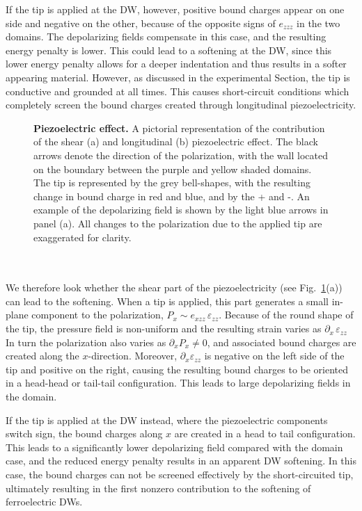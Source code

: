 If the tip is applied at the DW, however, positive bound charges appear on one side and negative on the other, because of the opposite signs of $e_{zzz}$ in the two domains.
The depolarizing fields compensate in this case, and the resulting energy penalty is lower.
This could lead to a softening at the DW, since this lower energy penalty allows for a deeper indentation and thus results in a softer appearing material.
However, as discussed in the experimental Section, the tip is conductive and grounded at all times.
This causes short-circuit conditions which completely screen the bound charges created through longitudinal piezoelectricity.
\begin{figure}[h]
	\caption{\label{fig:BTO_depolarizing}{\bf Piezoelectric effect.} A pictorial representation of the contribution of the shear (a) and longitudinal (b) piezoelectric effect. The black arrows denote the direction of the polarization, with the wall located on the boundary between the purple and yellow shaded domains. The tip is represented by the grey bell-shapes, with the resulting change in bound charge in red and blue, and by the + and -. An example of the depolarizing field is shown by the light blue arrows in panel (a). All changes to the polarization due to the applied tip are exaggerated for clarity.}
\end{figure}
\\\\
We therefore look whether the shear part of the piezoelectricity (see Fig.~\ref{fig:BTO_depolarizing}(a)) can lead to the softening.
When a tip is applied, this part generates a small in-plane component to the polarization, $P_x \sim e_{xzz}\,\varepsilon_{zz}$.
Because of the round shape of the tip, the pressure field is non-uniform and the resulting strain varies as $\partial_x\,\varepsilon_{zz}$
In turn the polarization also varies as $\partial_x P_x\neq 0$, and associated bound charges are created along the $x$-direction.
Moreover, $\partial_x \varepsilon_{zz}$ is negative on the left side of the tip and positive on the right, causing the resulting bound charges to be oriented in a head-head or tail-tail configuration.
This leads to large depolarizing fields in the domain.

If the tip is applied at the DW instead, where the piezoelectric components switch sign, the bound charges along $x$ are created in a head to tail configuration.
This leads to a significantly lower depolarizing field compared with the domain case, and the reduced energy penalty results in an apparent DW softening.
In this case, the bound charges can not be screened effectively by the short-circuited tip, ultimately resulting in the first nonzero contribution to the softening of ferroelectric DWs. 

